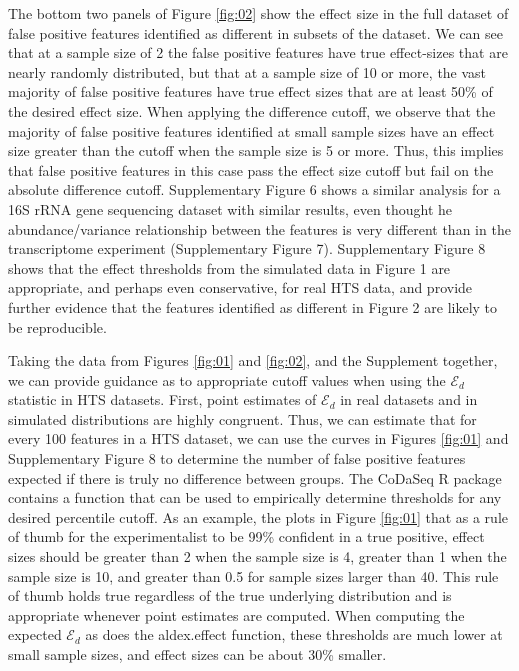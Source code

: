 \documentclass{bioinfo}
\begin{document}
The bottom two panels of Figure \ref{fig:02} show the effect size in the full dataset of false positive features identified as different in subsets of the dataset. We can see that at a sample size of 2 the false positive features have true effect-sizes that are nearly randomly distributed, but that at a sample size of 10 or more, the vast majority of false positive features have true effect sizes that are at least 50\% of the desired effect size. When applying the difference cutoff, we observe that the majority of false positive features identified at small sample sizes have an effect size greater than the cutoff when the sample size is 5 or more. Thus, this implies that false positive features in this case pass the effect size cutoff but fail on the absolute difference cutoff. Supplementary Figure 6 shows a similar analysis for a 16S rRNA gene sequencing dataset \citep{bian:2017} with similar results, even thought he abundance/variance relationship between the features is very different than in the transcriptome experiment (Supplementary Figure 7). Supplementary Figure 8 shows that the effect thresholds from the simulated data in Figure 1 are appropriate, and perhaps even conservative, for real HTS data, and provide further evidence that the features identified as different in Figure 2 are likely to be reproducible.

Taking the data from Figures \ref{fig:01} and \ref{fig:02}, and the Supplement together, we can provide guidance as to appropriate cutoff values when using the $\mathcal{E}_{d} $ statistic in HTS datasets. First,  point estimates of $\mathcal{E}_{d} $ in real datasets and in simulated distributions are highly congruent. Thus, we can estimate that for every 100 features in a HTS dataset, we can use the curves in Figures \ref{fig:01} and  Supplementary Figure 8 to determine the number of false positive features expected if there is truly no difference between groups. The CoDaSeq R package contains a function that can be used to empirically determine thresholds for any desired percentile cutoff. As an example, the plots in Figure \ref{fig:01} that as a rule of thumb for the experimentalist to be 99\% confident in a true positive, effect sizes should be greater than 2 when the sample size is  4, greater than 1 when the sample size is 10, and greater than 0.5 for sample sizes larger than 40. This rule of thumb holds true regardless of the true underlying distribution and is appropriate whenever point estimates are computed. When computing the expected $\mathcal{E}_{d} $ as does the aldex.effect function, these thresholds are much lower at small sample sizes, and effect sizes can be about 30\% smaller. 
\end{document}
